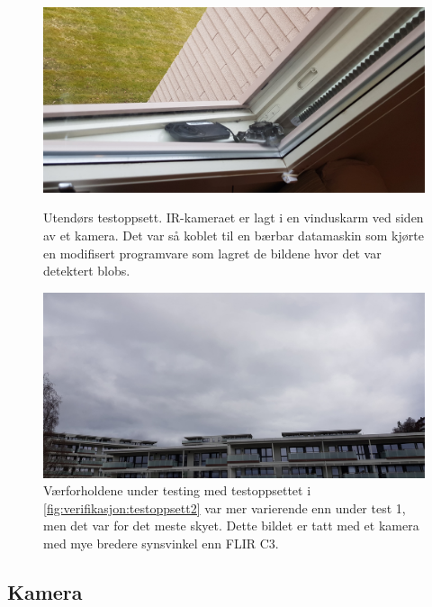 \begin{figure}[H]
    \centering
    \begin{minipage}{0.48\textwidth}
        \centering
        \includegraphics[width=1\textwidth]{verifikasjon-test/Testoppsett/Testoppsett1.jpg}
        \caption{Utendørs testoppsett. IR-kameraet er lagt i en vinduskarm ved siden av et kamera. Det var så koblet til en bærbar datamaskin som kjørte en modifisert programvare som lagret de bildene hvor det var detektert blobs.}
        \label{fig:verifikasjon:testoppsett2}
    \end{minipage}\hfill
    \begin{minipage}{0.48\textwidth}
        \centering
        \includegraphics[width=1\textwidth]{verifikasjon-test/Testoppsett/Testoppsett3.jpg}
        \caption{Værforholdene under testing med testoppsettet i     \autoref{fig:verifikasjon:testoppsett2} var mer varierende enn under test 1, men det var for det meste skyet. Dette bildet er tatt med et kamera med mye bredere synsvinkel enn FLIR C3.}
        \label{fig:verifikasjon:værTest2}
    \end{minipage}
\end{figure}


\subsection{Kamera}\label{sec:verifikasjon:kamera}

